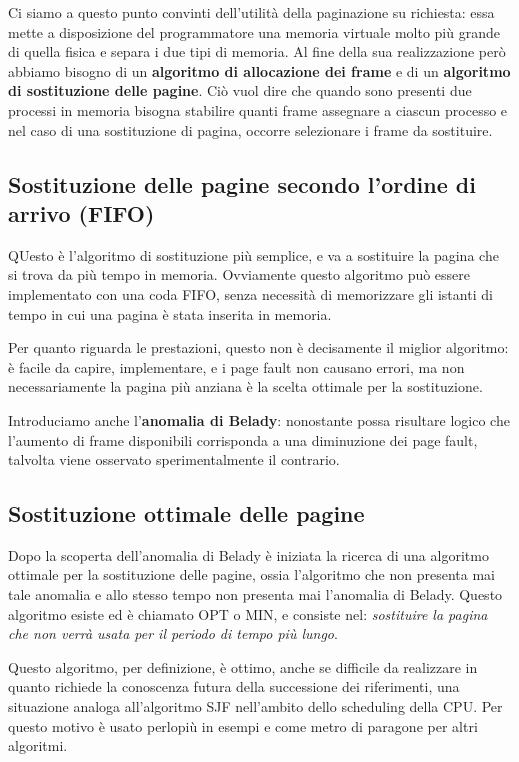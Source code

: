         Ci siamo a questo punto convinti dell'utilità della paginazione su richiesta: essa mette a disposizione del programmatore una memoria virtuale molto più grande di quella fisica e separa i due tipi di memoria. Al fine della sua realizzazione però abbiamo bisogno di un \textbf{algoritmo di allocazione dei frame} e di un \textbf{algoritmo di sostituzione delle pagine}. Ciò vuol dire che quando sono presenti due processi in memoria bisogna stabilire quanti frame assegnare a ciascun processo e nel caso di una sostituzione di pagina, occorre selezionare i frame da sostituire.
        
    \subsection{Sostituzione delle pagine secondo l'ordine di arrivo (FIFO)}
        QUesto è l'algoritmo di sostituzione più semplice, e va a sostituire la pagina che si trova da più tempo in memoria. Ovviamente questo algoritmo può essere implementato con una coda FIFO, senza necessità di memorizzare gli istanti di tempo in cui una pagina è stata inserita in memoria.
        
        Per quanto riguarda le prestazioni, questo non è decisamente il miglior algoritmo: è facile da capire, implementare, e i page fault non causano errori, ma non necessariamente la pagina più anziana è la scelta ottimale per la sostituzione.
        
        Introduciamo anche l'\textbf{anomalia di Belady}: nonostante possa risultare logico che l'aumento di frame disponibili corrisponda a una diminuzione dei page fault, talvolta viene osservato sperimentalmente il contrario.
        
    \subsection{Sostituzione ottimale delle pagine}
        Dopo la scoperta dell'anomalia di Belady è iniziata la ricerca di una algoritmo ottimale per la sostituzione delle pagine, ossia l'algoritmo che non presenta mai tale anomalia e allo stesso tempo non presenta mai l'anomalia di Belady. Questo algoritmo esiste ed è chiamato OPT o MIN, e consiste nel: \textit{sostituire la pagina che non verrà usata per il periodo di tempo più lungo}.
        
        Questo algoritmo, per definizione, è ottimo, anche se difficile da realizzare in quanto richiede la conoscenza futura della successione dei riferimenti, una situazione analoga all'algoritmo SJF nell'ambito dello scheduling della CPU. Per questo motivo è usato perlopiù in esempi e come metro di paragone per altri algoritmi.
        
